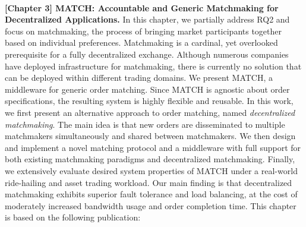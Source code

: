 \\

\textbf{[Chapter 3] MATCH: Accountable and Generic Matchmaking for Decentralized Applications.}
In this chapter, we partially address RQ2 and focus on matchmaking, the process of bringing market participants together based on individual preferences.
Matchmaking is a cardinal, yet overlooked prerequisite for a fully decentralized exchange.
Although numerous companies have deployed infrastructure for matchmaking, there is currently no solution that can be deployed within different trading domains.
We present MATCH, a middleware for generic order matching.
Since MATCH is agnostic about order specifications, the resulting system is highly flexible and reusable.
In this work, we first present an alternative approach to order matching, named \emph{decentralized matchmaking}.
The main idea is that new orders are disseminated to multiple matchmakers simultaneously and shared between matchmakers.
We then design and implement a novel matching protocol and a middleware with full support for both existing matchmaking paradigms and decentralized matchmaking.
Finally, we extensively evaluate desired system properties of MATCH under a real-world ride-hailing and asset trading workload.
Our main finding is that decentralized matchmaking exhibits superior fault tolerance and load balancing, at the cost of moderately increased bandwidth usage and order completion time.
This chapter is based on the following publication:

\\

